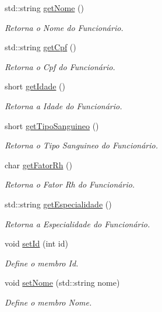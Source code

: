 \begin{DoxyCompactItemize}
std\+::string \hyperlink{classFuncionario_a35376709ae5c7357e79ca612a74e7f15}{get\+Nome} ()
\begin{DoxyCompactList}\small\item\em Retorna o Nome do Funcionário. \end{DoxyCompactList}\item 
std\+::string \hyperlink{classFuncionario_aad99a1c5373c00bf5ad161aad1b18a4f}{get\+Cpf} ()
\begin{DoxyCompactList}\small\item\em Retorna o Cpf do Funcionário. \end{DoxyCompactList}\item 
short \hyperlink{classFuncionario_ac8b1947b4cb1c1216291c4750670fba2}{get\+Idade} ()
\begin{DoxyCompactList}\small\item\em Retorna a Idade do Funcionário. \end{DoxyCompactList}\item 
short \hyperlink{classFuncionario_aa25f7aa3d2da9cda7081f262793ecad7}{get\+Tipo\+Sanguineo} ()
\begin{DoxyCompactList}\small\item\em Retorna o Tipo Sanguineo do Funcionário. \end{DoxyCompactList}\item 
char \hyperlink{classFuncionario_a87dc4304683c4a4492a5ecd516d29f44}{get\+Fator\+Rh} ()
\begin{DoxyCompactList}\small\item\em Retorna o Fator Rh do Funcionário. \end{DoxyCompactList}\item 
std\+::string \hyperlink{classFuncionario_a98b261893ff916049db28530d3ba1160}{get\+Especialidade} ()
\begin{DoxyCompactList}\small\item\em Retorna a Especialidade do Funcionário. \end{DoxyCompactList}\item 
void \hyperlink{classFuncionario_acc0b430d08b2c459682d7bb01c0ab1c4}{set\+Id} (int id)
\begin{DoxyCompactList}\small\item\em Define o membro Id. \end{DoxyCompactList}\item 
void \hyperlink{classFuncionario_a32e01bd23e422ab7598cd04dac51eb82}{set\+Nome} (std\+::string nome)
\begin{DoxyCompactList}\small\item\em Define o membro Nome. \end{DoxyCompactList}\item 

\end{DoxyCompactItemize}
